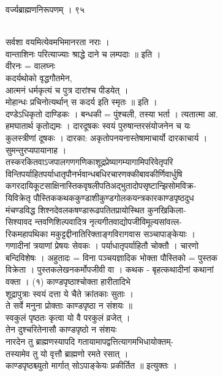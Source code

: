 \documentclass[11pt, openany]{book}
\begin{document}
{{{{{ }{ वर्ज्यब्राह्मणनिरूपणम् । ९५}{\\
सर्वशा वयमित्येवमभिमानरता नराः ।\\
वान्ताशिनः परित्याज्याः श्राद्धे दाने च लम्पदाः ॥ इति ।\\
वीरनः = वालघ्नः \textbar{}\\
कदर्यथोको वृद्धगौतमेन,\\
आत्मनं धर्मकृत्यं च पुत्र दारांश्च पीडयेत् ।\\
मोहान्धः प्रचिनोत्यर्थान् स कदर्य इति स्मृतः ॥ इति ।\\
दण्डेऽधिकृतो दाण्डिकः । बन्धकी = पुंश्चली, तस्या भर्ता । त्यतात्मा आ.\\
हमघातार्थ कृतोद्यमः । दारदूषकः स्वयं पुरुषान्तरसंयोजनेन च यः\\
कुलस्त्रीणां दूषकः । दारका: अकृतोपनयनास्तेषामाचार्यो दारकाचार्य ।\\
सुमन्तुरप्यपायानाह ।\\
तस्करकितवाऽजपालगणगणिकाशूद्रप्रेष्यागम्यागामिपरिवेतृपरि\\
विन्तिपर्याहितपर्याधातृपौनर्भवान्धबधिरचारणक्कीबावकीर्णिवार्धुषि\\
कगरदायिकूटसाक्षिनास्तिकवृषलीपतिअद्भुतादोपसृष्टान्झिसोमविक्र-\\
यिविक्रेतृ पौस्तिककथककुण्डाशीकुण्डगोलकयन्त्रकारकाण्डपृष्ठदुध\\
मंचण्डविद्ध शिश्नदेवलकषण्डारूढपतितप्रायोस्थित कुनखिकिला-\\
सिश्यावद न्तवणिशिल्पवादित्र नृत्यगीतवाद्योपजीविमूल्यसांवत्ल-\\
रिकमहापथिका मकुट्टद्दीनातिरिक्ताङ्गविरागवास सञ्चापाङ्केयाः ।\\
गणादीनां त्रयाणां प्रेषयः सेवकः । पर्याधातृपर्याहितौ चोक्तौ । चारणो\\
बन्दिविशेषः । अहुतादः = विना पञ्चयज्ञादिक भोक्ता \textbar{} पौस्तिको =
पुस्तक\\
विक्रेता । पुस्तकलेखनकर्मोपजीवी वा । कथक - बृहत्कथादीनां कथानां\\
वक्ता । (१) काण्डपृष्ठाश्चोक्ता हारीतादिभे\\
शूद्रापुत्राः स्वयं दत्ता ये चैते क्रांतकाः सुताः ।\\
ते सर्वे मनुना प्रोक्ताः काण्डपृष्ठा न संशयः ॥\\
स्वकुलं पृष्ठतः कृत्वा यो वै परकुलं व्रजेत् ।\\
तेन दुश्चरितेनासौ काण्डपृष्ठो न संशयः \textbar{}\textbar{}\\
नारदेन तु ब्राह्मणस्यापदि गतायामापद्वत्तित्यागमभिधायोक्तम्-\\
तस्यामेव तु यो वृत्तौ ब्राह्मणो रमते रसात् ।\\
काण्डपृष्ठश्च्युतो मार्गात् सोऽपाङ्केयः प्रकीर्तित ॥ इत्युक्तः ।

}}}}}
\end{document}

